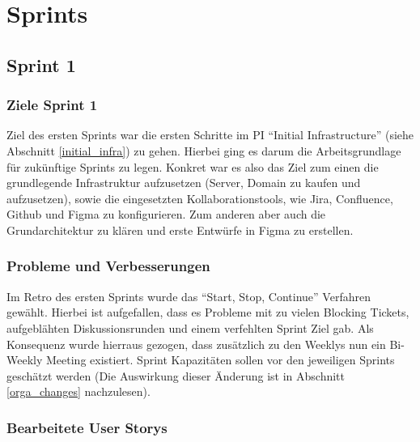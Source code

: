 
\chapter{Sprints} \label{sprints}

\section{Sprint 1}

\subsection{Ziele Sprint 1}
Ziel des ersten Sprints war die ersten Schritte im PI \enquote{Initial Infrastructure} (siehe Abschnitt \ref{initial_infra}) zu gehen.
Hierbei ging es darum die Arbeitsgrundlage für zukünftige Sprints zu legen.
Konkret war es also das Ziel zum einen die grundlegende Infrastruktur aufzusetzen (Server, Domain zu kaufen und aufzusetzen), sowie die eingesetzten Kollaborationstools, wie Jira, Confluence, Github und Figma zu konfigurieren.
Zum anderen aber auch die Grundarchitektur zu klären und erste Entwürfe in Figma zu erstellen.

\subsection{Probleme und Verbesserungen}
Im Retro des ersten Sprints wurde das \enquote{Start, Stop, Continue} Verfahren gewählt.
Hierbei ist aufgefallen, dass es Probleme mit zu vielen Blocking Tickets, aufgeblähten Diskussionsrunden und einem verfehlten Sprint Ziel gab. 
Als Konsequenz wurde hierraus gezogen, dass zusätzlich zu den Weeklys nun ein Bi-Weekly Meeting existiert. Sprint Kapazitäten sollen vor den jeweiligen Sprints geschätzt werden (Die Auswirkung dieser Änderung ist in Abschnitt \ref{orga_changes} nachzulesen).

\subsection{Bearbeitete User Storys}

